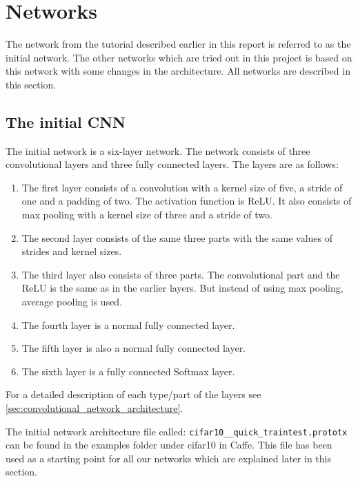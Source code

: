 \graphicspath{{Chapters/Project/}}

\section{Networks} %
\label{sec:networks}

The network from the tutorial described earlier in this report is referred to
as the initial network. The other networks which are tried out in this
project is based on this network with some changes in the architecture. All
networks are described in this section.

\subsection{The initial CNN} %
\label{sub:the_initial_network}

The initial network is a six-layer network. The network consists of three
convolutional layers and three fully connected layers. The layers are as
follows:

\begin{enumerate}
	\item The first layer consists of a convolution with a kernel size of five, a
	stride of one and a padding of two. The activation function is ReLU. It
	also consists of max pooling with a kernel size of three and a stride of two.
	\item The second layer consists of the same three parts with the same values
	of strides and kernel sizes.
	\item The third layer also consists of three parts. The convolutional part
	and the ReLU is the same as in the earlier layers. But instead of using max
	pooling, average pooling is used.
	\item The fourth layer is a normal fully connected layer.
	\item The fifth layer is also a normal fully connected layer.
	\item The sixth layer is a fully connected Softmax layer.
\end{enumerate}
For a detailed description of each type/part of the layers see
\autoref{sec:convolutional_network_architecture}.

The initial network architecture file called:
\verb|cifar10__quick_traintest.prototx| can be found in the examples folder
under cifar10 in Caffe\cite{caffe}. This file has been used as a starting point
for all our networks which are explained later in this section. 

